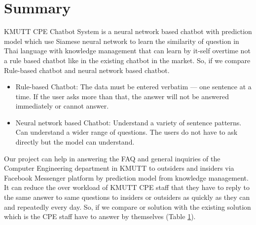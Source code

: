 \documentclass[12pt,oneside,openright,a4paper]{cpe-english-project}
\begin{document}
\section{Summary}
KMUTT CPE Chatbot System is a neural network based chatbot with prediction model which use
Siamese neural network to learn the similarity of question in Thai language with knowledge
management that can learn by it-self overtime not a rule based chatbot like in the existing
chatbot in the market. So, if we compare Rule-based chatbot and neural network based chatbot.
\begin{itemize}
  \item Rule-based Chatbot: The data must be entered verbatim — one sentence at a time. If the
  user asks more than that, the answer will not be answered immediately or cannot answer.
  \item Neural network based Chatbot: Understand a variety of sentence patterns. Can understand
  a wider range of questions. The users do not have to ask directly but the model can understand.
\end{itemize}
Our project can help in answering the FAQ and general inquiries of the Computer Engineering
department in KMUTT to outsiders and insiders via Facebook Messenger platform by prediction
model from knowledge management. It can reduce the over workload of KMUTT CPE staff that they
have to reply to the same answer to same questions to insiders or outsiders as quickly as they
can and repeatedly every day. So, if we compare or solution with the existing solution which is
the CPE staff have to answer by themselves (Table \ref*{table:ch3_solution_compare}).
\begin{figure}[h!]
  \centering
  \label{table:ch3_solution_compare}
\end{figure}
\end{document}
